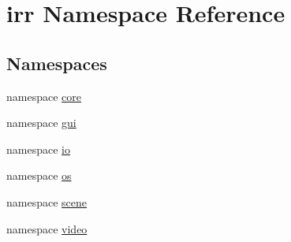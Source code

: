 \hypertarget{namespaceirr}{\section{irr Namespace Reference}
\label{namespaceirr}
}
\subsection*{Namespaces}
\begin{DoxyCompactItemize}
\item 
namespace \hyperlink{namespaceirr_1_1core}{core}
\item 
namespace \hyperlink{namespaceirr_1_1gui}{gui}
\item 
namespace \hyperlink{namespaceirr_1_1io}{io}
\item 
namespace \hyperlink{namespaceirr_1_1os}{os}
\item 
namespace \hyperlink{namespaceirr_1_1scene}{scene}
\item 
namespace \hyperlink{namespaceirr_1_1video}{video}
\end{DoxyCompactItemize}

